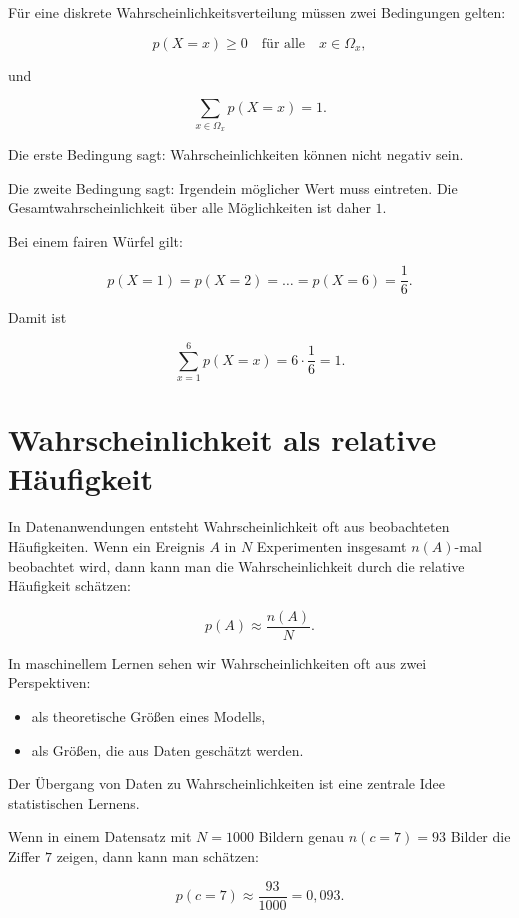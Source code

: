 Für eine diskrete Wahrscheinlichkeitsverteilung müssen zwei Bedingungen gelten:

\[
    p(X=x) \geq 0
    \quad
    \text{für alle}
    \quad
    x \in \Omega_x,
\]

und

\[
    \sum_{x \in \Omega_x} p(X=x) = 1.
\]

Die erste Bedingung sagt:
Wahrscheinlichkeiten können nicht negativ sein.

Die zweite Bedingung sagt:
Irgendein möglicher Wert muss eintreten.
Die Gesamtwahrscheinlichkeit über alle Möglichkeiten ist daher \(1\).

\begin{examplebox}
Bei einem fairen Würfel gilt:

\[
    p(X=1)
    =
    p(X=2)
    =
    \dots
    =
    p(X=6)
    =
    \frac{1}{6}.
\]

Damit ist

\[
    \sum_{x=1}^{6} p(X=x)
    =
    6 \cdot \frac{1}{6}
    =
    1.
\]
\end{examplebox}

\section{Wahrscheinlichkeit als relative Häufigkeit}

In Datenanwendungen entsteht Wahrscheinlichkeit oft aus beobachteten Häufigkeiten.
Wenn ein Ereignis \(A\) in \(N\) Experimenten insgesamt \(n(A)\)-mal beobachtet wird, dann kann man die Wahrscheinlichkeit durch die relative Häufigkeit schätzen:

\[
    p(A)
    \approx
    \frac{n(A)}{N}.
\]

\begin{conceptbox}
In maschinellem Lernen sehen wir Wahrscheinlichkeiten oft aus zwei Perspektiven:

\begin{itemize}
    \item als theoretische Größen eines Modells,
    \item als Größen, die aus Daten geschätzt werden.
\end{itemize}

Der Übergang von Daten zu Wahrscheinlichkeiten ist eine zentrale Idee statistischen Lernens.
\end{conceptbox}

\begin{examplebox}
Wenn in einem Datensatz mit \(N=1000\) Bildern genau \(n(c=7)=93\) Bilder die Ziffer \(7\) zeigen, dann kann man schätzen:

\[
    p(c=7)
    \approx
    \frac{93}{1000}
    =
    0{,}093.
\]
\end{examplebox}

